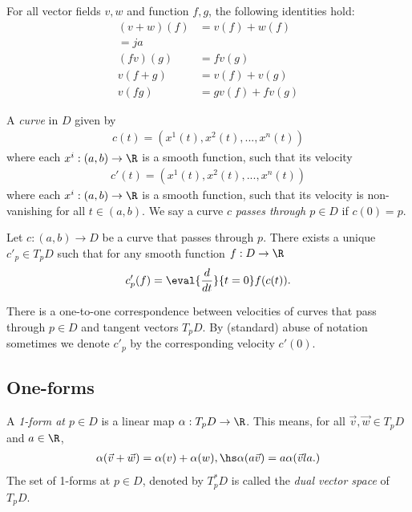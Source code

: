 \documentclass{article}
\begin{document}
\begin{proposition}
    For all vector fields $v,w$ and function $f,g$, the following identities hold:
    \begin{align*}
        (v+w)(f) &= v(f) + w(f)\\=ja\\
        (fv)(g)  &= fv(g) \\
        v(f+g)   &= v(f) + v(g) \\
        v(fg)    &= gv(f) + fv(g)
    \end{align*}
\end{proposition}

\begin{definition}
    A \emph{curve} in $D$ given by
    \begin{align*}
        c(t) = (x^1(t), x^2(t), ..., x^n(t))
    \end{align*}
    where each $x^i:(a,b)\to\R$ is a smooth function, such that its velocity
    \begin{align*}
        c'(t)=(x^1(t), x^2(t), ..., x^n(t))
    \end{align*}
    where each $x^i:(a,b)\to\R$ is a smooth function, such that its velocity
    is non-vanishing for all $t\in(a,b)$. 
    We say a curve $c$ \emph{passes through $p\in D$} if $c(0)=p$.
\end{definition}

\begin{proposition}
    Let $c:(a,b)\to D$ be a curve that passes through $p$. There exists a unique
    $c'_p\in T_p D$ such that for any smooth function $f:D\to\R$
    \begin{align*}
        c'_p(f) = \eval{\frac{d}{dt}}{t=0} f(c(t)).
    \end{align*}
\end{proposition}

\begin{corollary}
    There is a one-to-one correspondence between velocities of curves that pass through 
    $p\in D$ and tangent vectors $T_pD$. By (standard) abuse of notation sometimes 
    we denote $c'_p$ by the corresponding velocity $c'(0)$.
\end{corollary}

\subsection{One-forms}

\begin{definition}
    A \emph{1-form at $p\in D$} is a linear map $\alpha:T_pD \to \R$. This means, for all
    $\vec v, \vec w\in T_pD$ and $a\in\R$,
    \begin{align*}
        \alpha(\vec v + \vec w) = \alpha(v) + \alpha(w),\hs \alpha(a\vec v) = a\alpha(\vec v    la.)
    \end{align*}
    The set of 1-forms at $p\in D$, denoted by $T^*_p D$ is called the \emph{dual vector space} of $T_p D$.
\end{definition}
\end{document}
